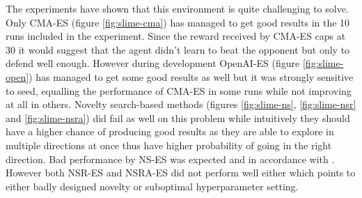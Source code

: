 The experiments have shown that this environment is quite challenging to solve. Only CMA-ES (figure \ref{fig:slime-cma}) has managed to get good results in the 10 runs included in the experiment. Since the reward received by CMA-ES caps at 30 it would suggest that the agent didn't learn to beat the opponent but only to defend well enough. However during development OpenAI-ES (figure \ref{fig:slime-open}) has managed to get some good results as well but it was strongly sensitive to seed, equalling the performance of CMA-ES in some runs while not improving at all in others. Novelty search-based methods (figures \ref{fig:slime-ns}, \ref{fig:slime-nsr} and \ref{fig:slime-nsra}) did fail as well on this problem while intuitively they should have a higher chance of producing good results as they are able to explore in multiple directions at once thus have higher probability of going in the right direction. Bad performance by NS-ES was expected and in accordance with \cite{conti2018}. However both NSR-ES and NSRA-ES did not perform well either which points to either badly designed novelty or suboptimal hyperparameter setting.

